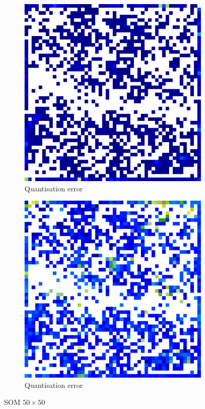 \documentclass{acm_proc_article-sp}
\begin{document}
\begin{figure}
\centering
\begin{subfigure}[b]{0.45\linewidth}
    \includegraphics[width=\linewidth]{img/wine-big-quant-error}
    \caption{Quantisation error}
    \label{fig:wine-big-quant-error}
\end{subfigure}
\begin{subfigure}[b]{0.45\linewidth}
    \includegraphics[width=\linewidth]{img/wine-big-mean-quant-error}
    \caption{Quantisation error}
    \label{fig:wine-big-mean-quant-error}
\end{subfigure}
\caption{SOM $50\times50$}
\end{figure}
\end{document}
